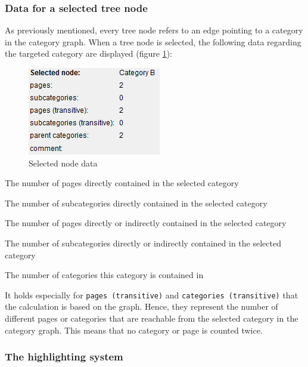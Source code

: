 \documentclass{scrartcl}
\begin{document}
\subsubsection{Data for a selected tree node}

As previously mentioned, every tree node refers to an edge pointing to a category in the category graph. When a tree node is selected, the following data regarding the targeted category are displayed (figure \ref{fig:node_data}):

\begin{figure}[h]
\centering
\includegraphics[scale=0.7]{figures/node_data.png}
\caption{Selected node data}
\label{fig:node_data}
\end{figure}

\begin{description}
\small
\item[pages] The number of pages directly contained in the selected category
\item[categories] The number of subcategories directly contained in the selected category
\item[pages (transitive)] The number of pages directly or indirectly contained in the selected category
\item[categories (transitive)] The number of subcategories directly or indirectly contained in the selected category
\item[parent categories] The number of categories this category is contained in
\end{description}

It holds especially for \texttt{pages (transitive)} and \texttt{categories (transitive)} that the calculation is based on the graph. Hence, they represent the number of different pages or categories that are reachable from the selected category in the category graph. This means that no category or page is counted twice.

\subsubsection{The highlighting system}
\end{document}
